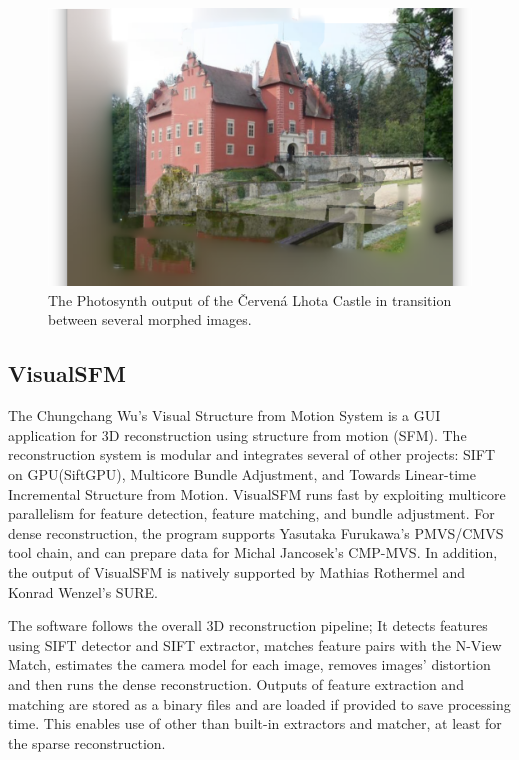 \begin{figure}[ht]
	\begin{center}
		\includegraphics[keepaspectratio,width=\textwidth]{fig/Photosynth.png}
	\end{center}
	\caption{The Photosynth output of the Červená Lhota Castle in transition between several morphed images.}
	\label{fig:visualsfm}
\end{figure}

\subsection*{VisualSFM}
The Chungchang Wu's Visual Structure from Motion System is a GUI application for 3D reconstruction using structure from motion (SFM). The reconstruction system is modular and integrates several of other projects: SIFT on GPU(SiftGPU), Multicore Bundle Adjustment, and Towards Linear-time Incremental Structure from Motion. VisualSFM runs fast by exploiting multicore parallelism for feature detection, feature matching, and bundle adjustment. For dense reconstruction, the program supports Yasutaka Furukawa's PMVS/CMVS tool chain, and can prepare data for Michal Jancosek's CMP-MVS. In addition, the output of VisualSFM is natively supported by Mathias Rothermel and Konrad Wenzel's SURE.

The software follows the overall 3D reconstruction pipeline; It detects features using SIFT detector and SIFT extractor, matches feature pairs with the N-View Match, estimates the camera model for each image, removes images' distortion and then runs the dense reconstruction. Outputs of feature extraction and matching are stored as a binary files and are loaded if provided to save processing time. This enables use of other than built-in extractors and matcher, at least for the sparse reconstruction. \cite{www:visual_sfm}

